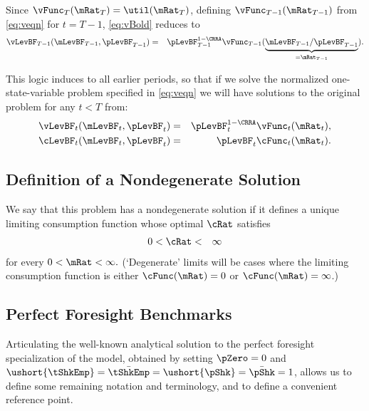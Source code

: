 \documentclass[titlepage]{\econtex}\providecommand{\texname}{BufferStockTheory}
\begin{document}
Since $\vFunc_{T}(\mRat_{T}) = \util(\mRat_{T})$, defining $\vFunc_{T-1}(\mRat_{T-1})$ from \eqref{eq:veqn} for $t=T-1$, \eqref{eq:vBold} reduces to
\begin{eqnarray*}
\vLevBF_{T-1}(\mLevBF_{T-1},\pLevBF_{T-1}) & = & \pLevBF_{T-1}^{1-\CRRA} \vFunc_{T-1}(\underbrace{\mLevBF_{T-1}/\pLevBF_{T-1}}_{=\mRat_{T-1}}).
\end{eqnarray*}

This logic induces to all earlier periods, so that if we solve the
normalized one-state-variable problem specified in \eqref{eq:veqn} we
will have solutions to the original problem for any $t<T$
from:
\begin{eqnarray*}
   \vLevBF_{t}(\mLevBF_{t},\pLevBF_{t}) & = & \pLevBF_{t}^{1-\CRRA}\vFunc_{t}(\mRat_{t}),
\\ \cLevBF_{t}(\mLevBF_{t},\pLevBF_{t}) & = & \pLevBF_{t}\cFunc_{t}(\mRat_{t}).
\end{eqnarray*}

\hypertarget{Definition-of-a-Nondegenerate-Solution}{}
\subsection{Definition of a Nondegenerate Solution}

We say that this problem has a nondegenerate solution if it
defines a unique limiting consumption function whose optimal
$\cRat$ satisfies
\begin{eqnarray}
  0 & < \cRat < & \infty
\end{eqnarray}
for every $0 < \mRat < \infty.$ (`Degenerate' limits will be cases
where the limiting consumption function is either $\cFunc(\mRat)=0$ or $\cFunc(\mRat)=\infty$.)

\hypertarget{Perfect-Foresight-Benchmarks}{}
\subsection{Perfect Foresight Benchmarks}

Articulating the well-known analytical solution to the perfect foresight specialization of the model, obtained by setting $\pZero=0$ and $\ushort{\tShkEmp}=\bar{\tShkEmp}=\ushort{\pShk}=\bar{\pShk}=1$, allows us to define some remaining notation and terminology, and to define a convenient reference point.

\hypertarget{Human-Wealth}{}
\end{document}
